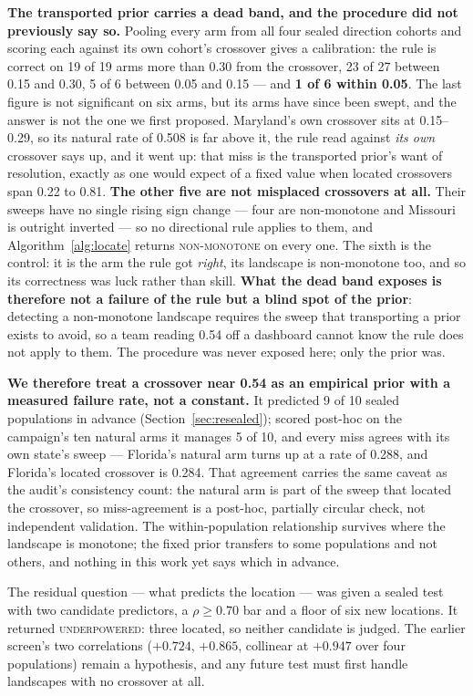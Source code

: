 \documentclass[conference]{IEEEtran}
\begin{document}
\textbf{The transported prior carries a dead band, and the procedure did not previously
say so.} Pooling every arm from all four sealed direction cohorts and scoring each against
its own cohort's crossover gives a calibration: the rule is correct on 19 of 19 arms more
than 0.30 from the crossover, 23 of 27 between 0.15 and 0.30, 5 of 6 between 0.05 and 0.15
--- and \textbf{1 of 6 within 0.05}. The last figure is not significant on six arms, but its
arms have since been swept, and the answer is not the one we first proposed. Maryland's own
crossover sits at 0.15--0.29, so its natural rate of 0.508 is far above it, the rule read
against \emph{its own} crossover says up, and it went up: that miss is the transported
prior's want of resolution, exactly as one would expect of a fixed value when located crossovers span 0.22 to 0.81. \textbf{The other five are not misplaced crossovers at all.}
Their sweeps have no single rising sign change --- four are non-monotone and Missouri is
outright inverted --- so no directional rule applies to them, and
Algorithm~\ref{alg:locate} returns \textsc{non-monotone} on every one. The sixth is the
control: it is the arm the rule got \emph{right}, its landscape is non-monotone too, and so
its correctness was luck rather than skill. \textbf{What the dead band exposes is therefore
not a failure of the rule but a blind spot of the prior}: detecting a non-monotone landscape
requires the sweep that transporting a prior exists to avoid, so a team reading 0.54 off a
dashboard cannot know the rule does not apply to them. The procedure was never exposed here;
only the prior was.

\textbf{We therefore treat a crossover near 0.54 as an empirical prior with a measured
failure rate, not a constant.} It predicted 9 of 10 sealed populations in advance
(Section~\ref{sec:resealed}); scored post-hoc on the campaign's ten natural arms it manages
5 of 10, and every miss agrees with its own state's sweep --- Florida's natural arm turns up
at a rate of 0.288, and Florida's located crossover is 0.284. That agreement carries the
same caveat as the audit's consistency count: the natural arm is part of the sweep that
located the crossover, so miss-agreement is a post-hoc, partially circular check, not
independent validation. The within-population
relationship survives where the landscape is monotone; the fixed prior transfers to some
populations and not others, and nothing in this work yet says which in advance.

The residual question --- what predicts the location --- was given a sealed test with two
candidate predictors, a $\rho \geq 0.70$ bar and a floor of six new locations. It returned
\textsc{underpowered}: three located, so neither candidate is judged. The earlier screen's
two correlations ($+0.724$, $+0.865$, collinear at $+0.947$ over four populations) remain a
hypothesis, and any future test must first handle landscapes with no crossover at all.
\end{document}
